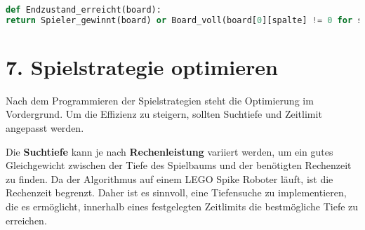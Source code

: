 \begin{lstlisting}[language=Python, caption=Erkennung des Endzustands]
def Endzustand_erreicht(board):
return Spieler_gewinnt(board) or Board_voll(board[0][spalte] != 0 for spalte in range(7))
\end{lstlisting}

\section*{7. Spielstrategie optimieren}

Nach dem Programmieren der Spielstrategien steht die Optimierung im Vordergrund. Um die Effizienz zu steigern, sollten Suchtiefe und Zeitlimit angepasst werden.

Die \textbf{Suchtiefe} kann je nach \textbf{Rechenleistung} variiert werden, um ein gutes Gleichgewicht zwischen der Tiefe des Spielbaums und der benötigten Rechenzeit zu finden. Da der Algorithmus auf einem LEGO Spike Roboter läuft, ist die Rechenzeit begrenzt. Daher ist es sinnvoll, eine Tiefensuche zu implementieren, die es ermöglicht, innerhalb eines festgelegten Zeitlimits die bestmögliche Tiefe zu erreichen. 







